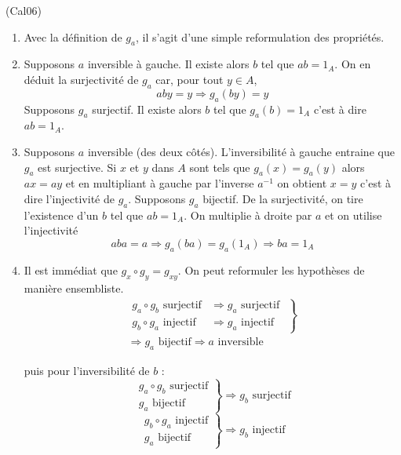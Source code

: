 \begin{tiny}(Cal06)\end{tiny}
\begin{enumerate}
 \item Avec la définition de $g_a$, il s'agit d'une simple reformulation des propriétés. 
 \item Supposons $a$ inversible à gauche. Il existe alors $b$ tel que $ab=1_A$. On en déduit la surjectivité de $g_a$ car, pour tout $y\in A$,
\begin{displaymath}
 aby=y\Rightarrow g_a(by)=y
\end{displaymath}
Supposons $g_a$ surjectif. Il existe alors $b$ tel que $g_a(b)=1_A$ c'est à dire $ab=1_A$.
 \item Supposons $a$ inversible (des deux côtés). L'inversibilité à gauche entraine que $g_a$ est surjective. Si $x$ et $y$ dans $A$ sont tels que $g_a(x)=g_a(y)$ alors $ax=ay$ et en multipliant à gauche par l'inverse $a^{-1}$ on obtient $x=y$ c'est à dire l'injectivité de $g_a$.\newline
Supposons $g_a$ bijectif. De la surjectivité, on tire l'existence d'un $b$ tel que $ab=1_A$. On multiplie à droite par $a$ et on utilise l'injectivité
\begin{displaymath}
 aba=a\Rightarrow g_a(ba)=g_a(1_A) \Rightarrow ba=1_A
\end{displaymath}

 \item Il est immédiat que $g_x \circ g_y = g_{xy}$. On peut reformuler les hypothèses de manière ensembliste.
\begin{multline*}
 \left. 
\begin{aligned}
 g_a \circ g_b\text{ surjectif} &\Rightarrow g_a \text{ surjectif }\\
 g_b \circ g_a \text{ injectif} &\Rightarrow g_a \text{ injectif }
\end{aligned}
\right\rbrace \\ 
\Rightarrow
 g_a \text{ bijectif} \Rightarrow a \text{ inversible }
\end{multline*}

puis pour l'inversibilité de $b$ :
\begin{displaymath}
 \left. 
\begin{aligned}
 g_a \circ g_b\text{ surjectif}\\
 g_a \text{ bijectif}
\end{aligned}
\right\rbrace \Rightarrow g_b \text{ surjectif}
\end{displaymath}
\begin{displaymath}
 \left. 
\begin{aligned}
 g_b \circ g_a\text{ injectif}\\
 g_a \text{ bijectif}
\end{aligned}
\right\rbrace \Rightarrow g_b \text{ injectif}
\end{displaymath}

\end{enumerate}
